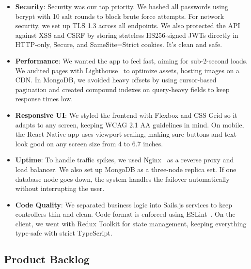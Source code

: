 \documentclass[12pt,a4paper]{report}
\begin{document}
\begin{itemize}
    \item \textbf{Security}: Security was our top priority. We hashed all passwords using bcrypt with 10 salt rounds to block brute force attempts. For network security, we set up TLS 1.3 across all endpoints. We also protected the API against XSS and CSRF by storing stateless HS256-signed JWTs directly in HTTP-only, Secure, and SameSite=Strict cookies. It's clean and safe.
    \item \textbf{Performance}: We wanted the app to feel fast, aiming for sub-2-second loads. We audited pages with Lighthouse~\cite{lighthouse} to optimize assets, hosting images on a CDN. In MongoDB, we avoided heavy offsets by using cursor-based pagination and created compound indexes on query-heavy fields to keep response times low.
    \item \textbf{Responsive UI}: We styled the frontend with Flexbox and CSS Grid so it adapts to any screen, keeping WCAG 2.1 AA guidelines in mind. On mobile, the React Native app uses viewport scaling, making sure buttons and text look good on any screen size from 4 to 6.7 inches.
    \item \textbf{Uptime}: To handle traffic spikes, we used Nginx~\cite{nginx} as a reverse proxy and load balancer. We also set up MongoDB as a three-node replica set. If one database node goes down, the system handles the failover automatically without interrupting the user.
    \item \textbf{Code Quality}: We separated business logic into Sails.js services to keep controllers thin and clean. Code format is enforced using ESLint~\cite{eslint}. On the client, we went with Redux Toolkit for state management, keeping everything type-safe with strict TypeScript.
\end{itemize}

\subsection{Product Backlog}

\renewcommand{\arraystretch}{1.25}
\setlength{\tabcolsep}{4pt}
\end{document}
